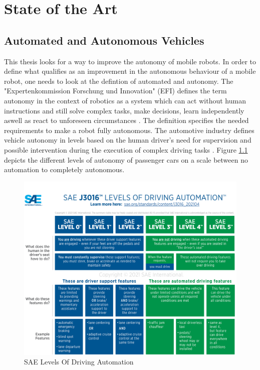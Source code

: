 \chapter{State of the Art}
\label{cha:state of the art}

\section{Automated and Autonomous Vehicles}

This thesis looks for a way to improve the autonomy of mobile robots. In order to define what qualifies as an improvement in the autonomous behaviour of a mobile robot, one needs to look at the defintion of automated and autonomy. 
The "Expertenkommission Forschung und Innovation" (EFI) defines the term autonomy in the context of robotics as a system which can act without human instructions and still solve complex tasks, make decisions, learn independently aswell as react to unforeseen circumstances \cite{efi2018}. 
The definition specifies the needed requirements to make a robot fully autonomous. 
The automotive industry defines vehicle autonomy in levels based on the human driver's need for supervision and possible intervention during the execution of complex driving tasks \cite{J3016_202104}. Figure \ref{fig:sae_levels} depicts the different levels of autonomy of passenger cars on a scale between no automation to completely autonomous. \\

\begin{figure}[ht]
	\label{fig:sae_levels}
	\includegraphics[width=1.0\textwidth]{images/j3016graphic_2021.png}
	\caption{SAE Levels Of Driving Automation \cite{J3016_202104}  }
\end{figure}


